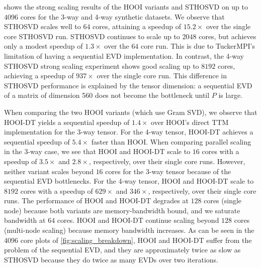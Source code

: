      shows the strong scaling results of the HOOI 
    variants and STHOSVD on up to $4096$ cores for the 3-way and 4-way
    synthetic datasets. We observe that STHOSVD scales well to $64$ cores,
    attaining a speedup of $15.2\times$ over the single core STHOSVD run.
    STHOSVD continues to scale up to $2048$ cores, but achieves only a modest
    speedup of $1.3\times$ over the $64$ core run. This is due to TuckerMPI's
    limitation of having a sequential EVD implementation. In contrast, the 4-way
    STHOSVD strong scaling experiment shows good scaling up to $8192$ cores,
    achieving a speedup of $937\times$ over the single core run. This difference
    in STHOSVD performance is explained by the tensor dimension: a sequential EVD of a matrix of dimension 560 does not become the bottleneck until $P$ is large.

    When comparing the two HOOI variants (which use Gram SVD), we observe that HOOI-DT yields a
    sequential speedup of $1.4\times$ over HOOI's direct TTM implementation for
    the 3-way tensor. For the 4-way tensor, HOOI-DT achieves a sequential
    speedup of $5.4\times$ faster than HOOI. When comparing parallel scaling in
    the 3-way case, we see that HOOI and HOOI-DT scale to $16$ cores with a
    speedup of $3.5\times$ and $2.8\times$, respectively, over their single core
    runs. However, neither variant scales beyond $16$ cores for the 3-way
    tensor because of the sequential EVD bottlenecks. 
    For the 4-way tensor, HOOI and HOOI-DT scale to $8192$ cores with a
    speedup of $629\times$ and $346\times$, respectively, over their single core
    runs.
    The performance of HOOI and HOOI-DT degrades at $128$ cores (single node)
    because both variants are memory-bandwidth bound, and we saturate bandwidth
    at $64$ cores. HOOI and HOOI-DT continue scaling beyond $128$ cores
    (multi-node scaling) because memory bandwidth increases. 
    As can be seen in the 4096 core plots of \cref{fig:scaling_breakdown},
    HOOI and HOOI-DT suffer from the problem of the sequential EVD, and they are approximately twice as
    slow as STHOSVD because they do twice as many EVDs over two iterations.


